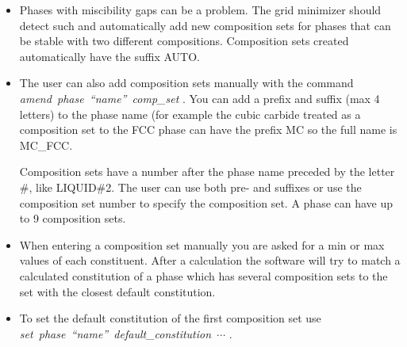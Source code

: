 \documentclass[12pt]{article}
\begin{document}
\begin{itemize}
\item Phases with miscibility gaps can be a problem.  The grid
  minimizer should detect such and automatically add new composition
  sets for phases that can be stable with two different compositions.
  Composition sets created automatically have the suffix AUTO.

\item The user can also add composition sets manually with the
  command\\ {\em amend~phase~``name''~comp\_set }.  You can add a
  prefix and suffix (max 4 letters) to the phase name (for example the
  cubic carbide treated as a composition set to the FCC phase can have
  the prefix MC so the full name is MC\_FCC.

  Composition sets have a number after the phase name preceded by the
  letter \#, like LIQUID\#2.  The user can use both pre- and suffixes
  or use the composition set number to specify the composition set.  A
  phase can have up to 9 composition sets.

\item When entering a composition set manually you are asked for a min
  or max values of each constituent.  After a calculation the software
  will try to match a calculated constitution of a phase which has
  several composition sets to the set with the closest default
  constitution.

\item To set the default constitution of the first composition set use
  {\em set~phase~``name''~default\_constitution~$\cdots$ }.


\end{itemize}
\end{document}
